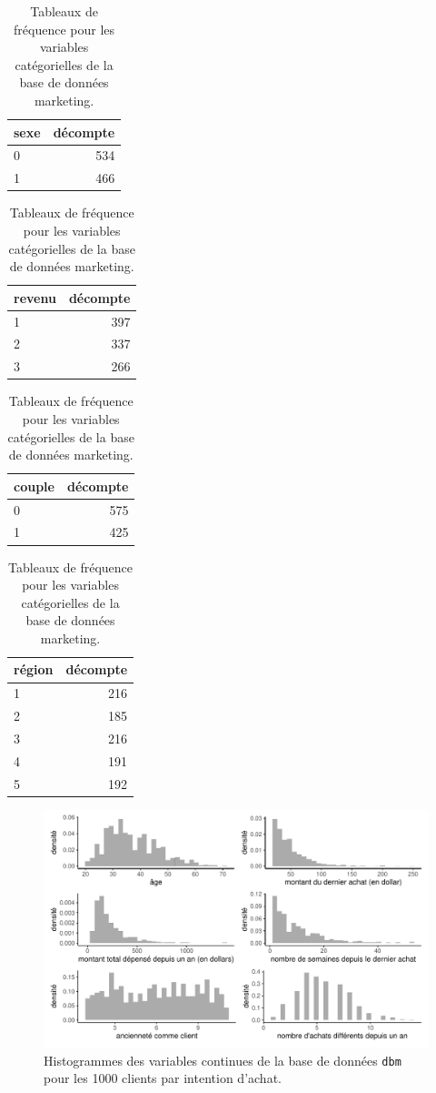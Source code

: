 \documentclass[
  11pt,
  letterpaper,
]{scrbook}
\theoremstyle{definition}
\theoremstyle{remark}
\begin{document}
\hypertarget{tbl-contingence-dbm}{}
\begin{table}
\caption{\label{tbl-contingence-dbm}Tableaux de fréquence pour les variables catégorielles de la base de
données marketing. }\tabularnewline


\begin{tabular}{lr}
\toprule
sexe & décompte\\
\midrule
0 & 534\\
1 & 466\\
\bottomrule
\end{tabular}
\begin{tabular}{lr}
\toprule
revenu & décompte\\
\midrule
1 & 397\\
2 & 337\\
3 & 266\\
\bottomrule
\end{tabular}
\begin{tabular}{lr}
\toprule
couple & décompte\\
\midrule
0 & 575\\
1 & 425\\
\bottomrule
\end{tabular}
\begin{tabular}{lr}
\toprule
région & décompte\\
\midrule
1 & 216\\
2 & 185\\
3 & 216\\
4 & 191\\
5 & 192\\
\bottomrule
\end{tabular}
\end{table}

\begin{figure}[ht!]

{\centering \includegraphics[width=1\textwidth,height=\textheight]{selectionmodeles_files/figure-pdf/fig-histogrammes-eda-dbm-1.pdf}

}

\caption{\label{fig-histogrammes-eda-dbm}Histogrammes des variables
continues de la base de données \texttt{dbm} pour les 1000 clients par
intention d'achat.}

\end{figure}
\end{document}
